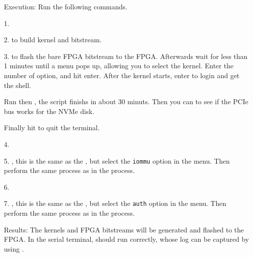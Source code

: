 \begin{compactdesc}
\begin{asparadesc}
        \item[Execution:] Run the following commands. 

        1. 

        2.  to build kernel and bitstream.

        3.  to flash the bare FPGA bitstream to the FPGA. Afterwards wait for less than 1 minutes until a menu pops up, allowing you to select the kernel. Enter the number of  option, and hit enter. After the kernel starts, enter  to login and get the shell.

        Run  then , the script finishs in about 30 minuts. Then you can  to see if the PCIe bus works for the NVMe disk.

        Finally hit \code{Ctrl+]} to quit the terminal.

        4. 

        5. , this is the same as the , but select the \texttt{iommu} option in the menu. Then perform the same process as in the  process.

        6. 

        7. , this is the same as the , but select the \texttt{auth} option in the menu. Then perform the same process as in the  process.

        \vspace{6pt}
        \item[Results:] The kernels and FPGA bitstreams will be generated and flashed to the FPGA. In the serial terminal,  should run correctly, whose log can be captured by using .
    \end{asparadesc}

\end{compactdesc}



